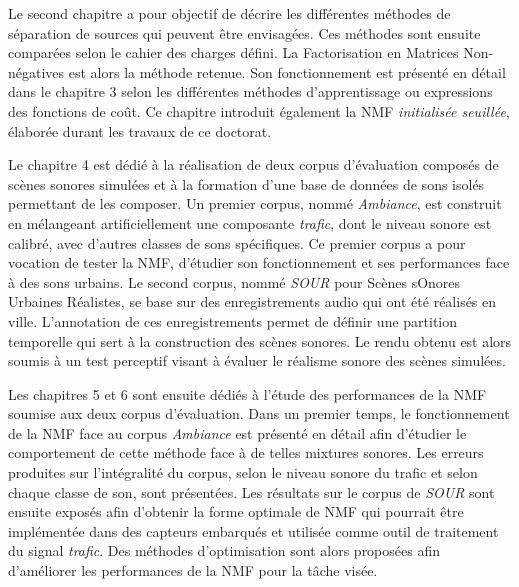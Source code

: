 Le second chapitre a pour objectif de décrire les différentes méthodes de séparation de sources qui peuvent être envisagées. Ces méthodes sont ensuite comparées selon le cahier des charges défini. La Factorisation en Matrices Non-négatives est alors la méthode retenue.
Son fonctionnement est présenté en détail dans le chapitre 3 selon les différentes méthodes d'apprentissage ou expressions des fonctions de coût. Ce chapitre introduit également la NMF \textit{initialisée seuillée}, élaborée durant les travaux de ce doctorat.

Le chapitre 4 est dédié à la réalisation de deux corpus d'évaluation composés de scènes sonores simulées et à la formation d'une base de données de sons isolés permettant de les composer.
Un premier corpus, nommé \textit{Ambiance}, est construit en mélangeant artificiellement une composante \textit{trafic}, dont le niveau sonore est calibré, avec d'autres classes de sons spécifiques. Ce premier corpus a pour vocation de tester la NMF, d'étudier son fonctionnement et ses performances face à des sons urbains.
Le second corpus, nommé \textit{SOUR} pour Scènes sOnores Urbaines Réalistes, se base sur des enregistrements audio qui ont été réalisés en ville.
L'annotation de ces enregistrements permet de définir une partition temporelle qui sert à la construction des scènes sonores. Le rendu obtenu est alors soumis à un test perceptif visant à évaluer le réalisme sonore des scènes simulées.

Les chapitres 5 et 6 sont ensuite dédiés à l'étude des performances de la NMF soumise aux deux corpus d'évaluation. Dans un premier temps, le fonctionnement de la NMF face au corpus \textit{Ambiance} est présenté en détail afin d'étudier le comportement de cette méthode face à de telles mixtures sonores. Les erreurs produites sur l'intégralité du corpus, selon le niveau sonore du trafic et selon chaque classe de son, sont présentées.
Les résultats sur le corpus de \textit{SOUR} sont ensuite exposés afin d'obtenir la forme optimale de NMF qui pourrait être implémentée dans des capteurs embarqués et utilisée comme outil de traitement du signal \textit{trafic}. Des méthodes d'optimisation sont alors proposées afin d'améliorer les performances de la NMF pour la tâche visée.
